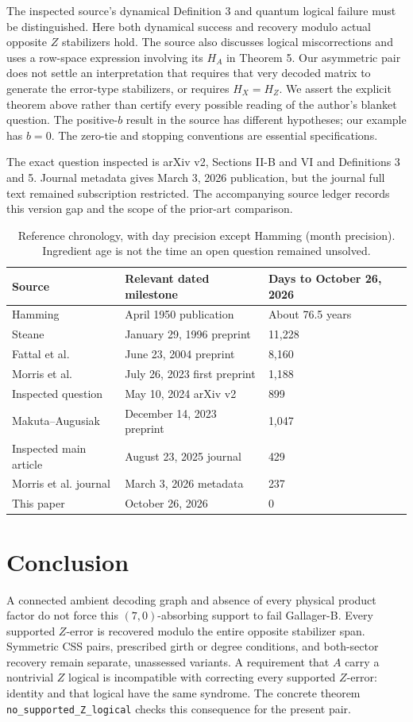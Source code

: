 \documentclass[11pt]{article}
\begin{document}
The inspected source's dynamical Definition 3 and quantum logical failure
must be distinguished. Here both dynamical success and recovery modulo
actual opposite $Z$ stabilizers hold. The source also discusses logical
miscorrections and uses a row-space expression involving its $H_A$ in
Theorem 5. Our asymmetric pair does not settle an interpretation that
requires that very decoded matrix to generate the error-type stabilizers,
or requires $H_X=H_Z$. We assert the explicit theorem above rather than
certify every possible reading of the author's blanket question.
The positive-$b$ result in the source has different hypotheses; our example
has $b=0$. The zero-tie and stopping conventions are essential specifications.

The exact question inspected is arXiv v2, Sections II-B and VI and
Definitions 3 and 5. Journal metadata gives March 3, 2026 publication, but
the journal full text remained subscription restricted. The accompanying
source ledger records this version gap and the scope of the prior-art
comparison.

\begin{table}[ht]\centering\small
\begin{tabular}{p{}p{}p{}}
\toprule Source & Relevant dated milestone & Days to October 26, 2026\\\midrule
Hamming & April 1950 publication & About 76.5 years\\
Steane & January 29, 1996 preprint & 11,228\\
Fattal et al. & June 23, 2004 preprint & 8,160\\
Morris et al. & July 26, 2023 first preprint & 1,188\\
Inspected question & May 10, 2024 arXiv v2 & 899\\
Makuta--Augusiak & December 14, 2023 preprint & 1,047\\
Inspected main article & August 23, 2025 journal & 429\\
Morris et al. journal & March 3, 2026 metadata & 237\\
This paper & October 26, 2026 & 0\\\bottomrule
\end{tabular}
\caption{Reference chronology, with day precision except Hamming (month
precision). Ingredient age is not the time an open question remained unsolved.}
\end{table}

\section{Conclusion}
A connected ambient decoding graph and absence of every physical product
factor do not force this $(7,0)$-absorbing support to fail Gallager-B.
Every supported $Z$-error is recovered modulo the entire opposite
stabilizer span. Symmetric CSS pairs, prescribed girth or degree conditions,
and both-sector recovery remain separate, unassessed variants.
A requirement that $A$ carry a nontrivial $Z$ logical is incompatible with
correcting every supported $Z$-error: identity and that logical have the
same syndrome. The concrete theorem \texttt{no\_supported\_Z\_logical}
checks this consequence for the present pair.
\end{document}
